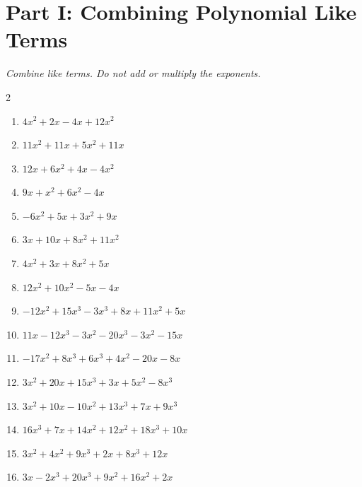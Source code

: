 \documentclass[11pt]{article}
\begin{document}
\section*{Part I: Combining Polynomial Like Terms}
\noindent\textit{Combine like terms. Do not add or multiply the exponents.}
\begin{multicols}{2}
\begin{enumerate}
  \item $4x^{2} + 2x - 4x + 12x^{2}$
  \vspace{1.3cm}
  \item $11x^{2} + 11x + 5x^{2} + 11x$
  \vspace{1.3cm}
  \item $12x + 6x^{2} + 4x - 4x^{2}$
  \vspace{1.3cm}
  \item $9x + x^{2} + 6x^{2} - 4x$
  \vspace{1.3cm}
  \item $-6x^{2} + 5x + 3x^{2} + 9x$
  \vspace{1.3cm}
  \item $3x + 10x + 8x^{2} + 11x^{2}$
  \vspace{1.3cm}
  \item $4x^{2} + 3x + 8x^{2} + 5x$
  \vspace{1.3cm}
  \item $12x^{2} + 10x^{2} - 5x - 4x$
  \vspace{1.3cm}
  \item $-12x^{2} + 15x^{3} - 3x^{3} + 8x + 11x^{2} + 5x$
  \vspace{1.3cm}
  \item $11x - 12x^{3} - 3x^{2} - 20x^{3} - 3x^{2} - 15x$
  \vspace{1.3cm}
  \item $-17x^{2} + 8x^{3} + 6x^{3} + 4x^{2} - 20x - 8x$
  \vspace{1.3cm}
  \item $3x^{2} + 20x + 15x^{3} + 3x + 5x^{2} - 8x^{3}$
  \vspace{1.3cm}
  \item $3x^{2} + 10x - 10x^{2} + 13x^{3} + 7x + 9x^{3}$
  \vspace{1.3cm}
  \item $16x^{3} + 7x + 14x^{2} + 12x^{2} + 18x^{3} + 10x$
  \vspace{1.3cm}
  \item $3x^{2} + 4x^{2} + 9x^{3} + 2x + 8x^{3} + 12x$
  \vspace{1.3cm}
  \item $3x - 2x^{3} + 20x^{3} + 9x^{2} + 16x^{2} + 2x$
  \vspace{1.3cm}
\end{enumerate}
\end{multicols}
\end{document}
